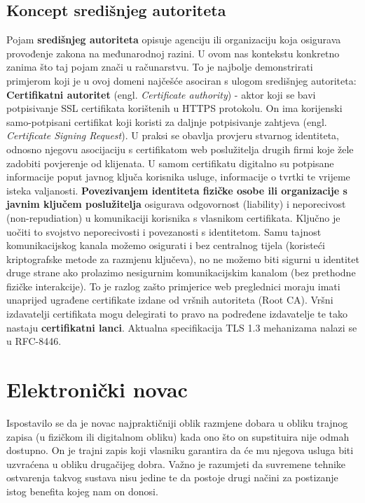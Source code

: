 \documentclass[utf8, zavrsni]{fer}
\begin{document}
\section{Koncept središnjeg autoriteta}
Pojam \textbf{središnjeg autoriteta} opisuje agenciju ili organizaciju koja osigurava provođenje zakona na međunarodnoj razini\cite{enwiki:969028445}. U ovom nas kontekstu konkretno zanima što taj pojam znači u računarstvu. To je najbolje demonstrirati primjerom koji je u ovoj domeni najčešće asociran s ulogom središnjeg autoriteta: \textbf{Certifikatni autoritet} (engl. \textit{Certificate authority}) - aktor koji se bavi potpisivanje SSL certifikata korištenih u HTTPS protokolu. On ima korijenski samo-potpisani certifikat koji koristi za daljnje potpisivanje zahtjeva (engl. \textit{Certificate Signing Request}). U praksi se obavlja provjeru stvarnog identiteta, odnosno njegovu asocijaciju s certifikatom web poslužitelja drugih firmi koje žele zadobiti povjerenje od klijenata. U samom certifikatu digitalno su potpisane informacije poput javnog ključa korisnika usluge, informacije o tvrtki te vrijeme isteka valjanosti. \textbf{Povezivanjem identiteta fizičke osobe ili organizacije s javnim ključem poslužitelja} osigurava odgovornost (liability) i neporecivost (non-repudiation) u komunikaciji korisnika s vlasnikom certifikata. Ključno je uočiti to svojstvo neporecivosti i povezanosti s identitetom. Samu tajnost komunikacijskog kanala možemo osigurati i bez centralnog tijela (koristeći kriptografske metode za razmjenu ključeva), no ne možemo biti sigurni u identitet druge strane ako prolazimo nesigurnim komunikacijskim kanalom (bez prethodne fizičke interakcije). To je razlog zašto primjerice web preglednici moraju imati unaprijed ugrađene certifikate izdane od vršnih autoriteta (Root CA). Vršni izdavatelji certifikata mogu delegirati to pravo na podređene izdavatelje te tako nastaju \textbf{certifikatni lanci}. Aktualna specifikacija TLS 1.3 mehanizama nalazi se u RFC-8446.


\chapter{Elektronički novac}

Ispostavilo se da je novac najpraktičniji oblik razmjene dobara u obliku trajnog zapisa (u fizičkom ili digitalnom obliku) kada ono što on supstituira nije odmah dostupno. On je trajni zapis koji vlasniku garantira da će mu njegova usluga biti uzvraćena u obliku drugačijeg dobra. Važno je razumjeti da suvremene tehnike ostvarenja takvog sustava nisu jedine te da postoje drugi načini za postizanje istog benefita kojeg nam on donosi.
\end{document}
